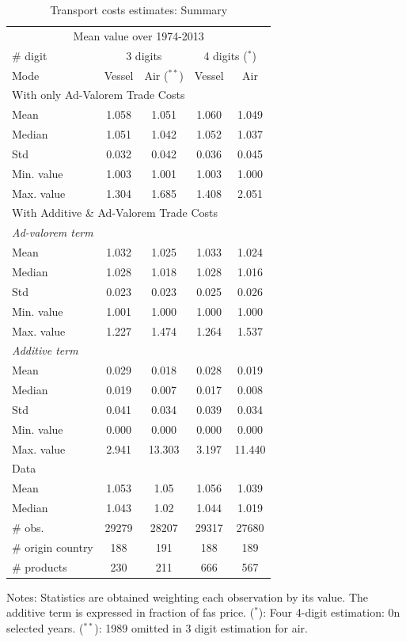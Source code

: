 \documentclass[a4paper,11pt]{article}
\begin{document}
\begin{table}[htbp]
  \centering
  \footnotesize{
  \caption{Transport costs estimates: Summary \label{tab:summary_results}}
  \begin{center}
    \begin{tabular}{l|cc|cc}
      \hline \hline
    \multicolumn{5}{c}{Mean value over 1974-2013}   \\
    \# digit & \multicolumn{2}{c}{3 digits} & \multicolumn{2}{c}{4 digits ($^\ast$)} \\ \hline
    Mode  & Vessel & Air ($^{\ast \ast}$) & Vessel & Air \\ \hline
    \multicolumn{5}{l}{With only Ad-Valorem Trade Costs }  \\ \hline
    Mean  & 1.058 & 1.051 & 1.060 & 1.049 \\
    Median & 1.051 & 1.042 & 1.052 & 1.037 \\
    Std   & 0.032 & 0.042 & 0.036 & 0.045 \\
    Min. value & 1.003 & 1.001 & 1.003 & 1.000 \\
    Max. value & 1.304 & 1.685 & 1.408 & 2.051 \\ \hline
    \multicolumn{5}{l}{With Additive \& Ad-Valorem Trade Costs } \\ \hline
   \textit{Ad-valorem term} & & & & \\ \hline
    Mean  & 1.032 & 1.025 & 1.033 & 1.024 \\
    Median & 1.028 & 1.018 & 1.028 & 1.016 \\
    Std   & 0.023 & 0.023 & 0.025 & 0.026 \\
    Min. value & 1.001 & 1.000 & 1.000 & 1.000 \\
    Max. value & 1.227 & 1.474 & 1.264 & 1.537 \\ \hline
    \textit{Additive term }& & & &   \\ \hline
    Mean  & 0.029 & 0.018 & 0.028 & 0.019 \\
    Median & 0.019 & 0.007 & 0.017 & 0.008 \\
    Std   & 0.041 & 0.034 & 0.039 & 0.034 \\
    Min. value & 0.000 & 0.000 & 0.000 & 0.000 \\
    Max. value & 2.941 & 13.303 & 3.197 & 11.440 \\ \hline
        \multicolumn{5}{l}{Data } \\ \hline
        Mean & 1.053 & 1.05& 1.056&1.039 \\
        Median & 1.043 & 1.02 & 1.044& 1.019 \\ \hline
        \# obs. & 29279 & 28207 & 29317 & 27680 \\
    \# origin country & 188 & 191 & 188 & 189 \\
    \# products & 230 & 211 & 666 & 567 \\  \hline \hline
  \end{tabular}
    \end{center}}
\parbox[l]{8cm}{\tiny{Notes: Statistics are obtained weighting each observation by its value. The additive term is expressed in fraction of fas price. ($^\ast$): Four 4-digit estimation: 0n selected years. ($^{\ast \ast}$): 1989 omitted in 3 digit estimation for air.}}
\end{table}%
\end{document}
